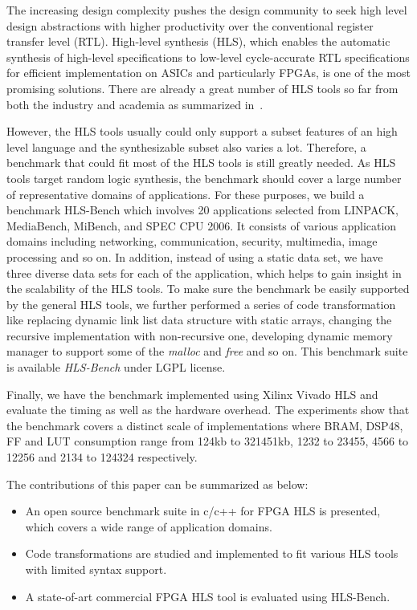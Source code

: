 \documentclass[conference]{IEEEtran}
\begin{document}
The increasing design complexity pushes the design community to seek high level design abstractions with higher productivity over the conventional register transfer level (RTL). High-level synthesis (HLS), which enables the automatic synthesis of high-level specifications to low-level cycle-accurate RTL specifications for efficient implementation on ASICs and particularly FPGAs, is one of the most promising solutions. There are already a great number of HLS tools so far from both the industry and academia as summarized in~\cite{martin2009high}. 

However, the HLS tools usually could only support a subset features of an high level language and the synthesizable subset also varies a lot. Therefore, a benchmark that could fit most of the HLS tools is still greatly needed. As HLS tools target random logic synthesis, the benchmark should cover a large number of representative domains of applications. For these purposes, we build a benchmark HLS-Bench which involves 20 applications selected from LINPACK, MediaBench, MiBench, and SPEC CPU 2006. It consists of various application domains including networking, communication, security, multimedia, image processing and so on. In addition, instead of using a static data set, we have three diverse data sets for each of the application, which helps to gain insight in the scalability of the HLS tools. To make sure the benchmark be easily supported by the general HLS tools, we further performed a series of code transformation like replacing dynamic link list data structure with static arrays, changing the recursive implementation with non-recursive one, developing dynamic memory manager to support some of the \emph{malloc} and \emph{free} and so on. This benchmark suite is available \emph{HLS-Bench} under LGPL license.

Finally, we have the benchmark implemented using Xilinx Vivado HLS and evaluate the timing as well as the hardware overhead. The experiments show that the benchmark covers a distinct scale of implementations where BRAM, DSP48, FF and LUT consumption range from 124kb to 321451kb, 1232 to 23455, 4566 to 12256 and 2134 to 124324 respectively.  

The contributions of this paper can be summarized as below:
\begin{itemize}
  \item An open source benchmark suite in c/c++ for FPGA HLS is presented, which covers a wide range of application domains.
  \item Code transformations are studied and implemented to fit various HLS tools with limited syntax support.
  \item A state-of-art commercial FPGA HLS tool is evaluated using HLS-Bench.
\end{itemize}
\end{document}
